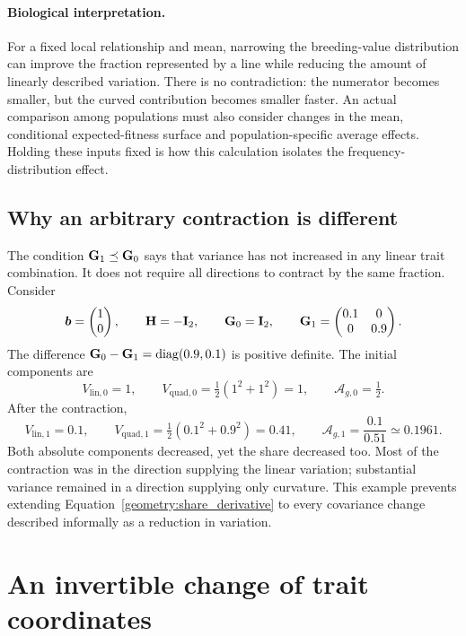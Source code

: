 \paragraph{Biological interpretation.}
For a fixed local relationship and mean, narrowing the breeding-value
distribution can improve the fraction represented by a line while
reducing the amount of linearly described variation. There is no
contradiction: the numerator becomes smaller, but the curved contribution
becomes smaller faster. An actual comparison among populations must also
consider changes in the mean, conditional expected-fitness surface and
population-specific average effects. Holding these inputs fixed is how
this calculation isolates the frequency-distribution effect.

\subsection{Why an arbitrary contraction is different}
\label{geometry:anisotropic_counterexample}

The condition $\mathbf{G}_1\preceq\mathbf{G}_0$ says that variance has not
increased in any linear trait combination. It does not require all
directions to contract by the same fraction. Consider
\[
\boldsymbol{b}=\begin{pmatrix}1\\0\end{pmatrix},\qquad
\mathbf{H}=-\mathbf{I}_2,\qquad
\mathbf{G}_0=\mathbf{I}_2,\qquad
\mathbf{G}_1=\begin{pmatrix}0.1&0\\0&0.9\end{pmatrix}.
\]
The difference $\mathbf{G}_0-\mathbf{G}_1=\operatorname{diag}(0.9,0.1)$ is
positive definite. The initial components are
\[
V_{\mathrm{lin},0}=1,\qquad
V_{\mathrm{quad},0}=\tfrac12(1^2+1^2)=1,\qquad
\mathcal A_{g,0}=\tfrac12.
\]
After the contraction,
\[
V_{\mathrm{lin},1}=0.1,\qquad
V_{\mathrm{quad},1}=\tfrac12(0.1^2+0.9^2)=0.41,\qquad
\mathcal A_{g,1}=\frac{0.1}{0.51}\simeq0.1961.
\]
Both absolute components decreased, yet the share decreased too. Most of
the contraction was in the direction supplying the linear variation;
substantial variance remained in a direction supplying only curvature.
This example prevents extending Equation~\eqref{geometry:share_derivative}
to every covariance change described informally as a reduction in variation.

\section{An invertible change of trait coordinates}
\label{geometry:coordinate_change}

